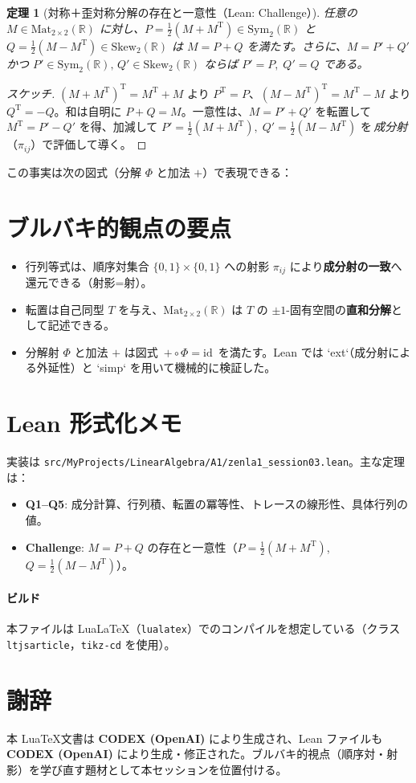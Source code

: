 \documentclass[luatexja,ja=standard,a4paper,12pt]{bxjsarticle}
\newcommand{\R}{\mathbb{R}}
\newcommand{\Mat}{\mathrm{Mat}}
\newcommand{\MatTwo}{\Mat_{2\times 2}(\R)}
\newcommand{\Sym}{\mathrm{Sym}_2(\R)}
\newcommand{\Skew}{\mathrm{Skew}_2(\R)}
\newcommand{\TT}{\mathrm{T}}
\theoremstyle{definition}
\theoremstyle{plain}
\newtheorem{theorem}{定理}
\theoremstyle{remark}
\begin{document}
\begin{theorem}[対称＋歪対称分解の存在と一意性（Lean: Challenge）]\label{thm:decomp}
任意の $M\in\MatTwo$ に対し、$P=\frac12(M+M^{\TT})\in\Sym$ と $Q=\frac12(M-M^{\TT})\in\Skew$ は $M=P+Q$ を満たす。さらに、$M=P'+Q'$ かつ $P'\in\Sym,\,Q'\in\Skew$ ならば $P'=P,\;Q'=Q$ である。
\end{theorem}

\begin{proof}[スケッチ]
$(M+M^{\TT})^{\TT}=M^{\TT}+M$ より $P^{\TT}=P$、$(M-M^{\TT})^{\TT}=M^{\TT}-M$ より $Q^{\TT}=-Q$。和は自明に $P+Q=M$。一意性は、$M=P'+Q'$ を転置して $M^{\TT}=P'-Q'$ を得、加減して $P'=\tfrac12(M+M^{\TT}),\;Q'=\tfrac12(M-M^{\TT})$ を\,\emph{成分射}\,（$\pi_{ij}$）で評価して導く。
\end{proof}

この事実は次の図式（分解 $\Phi$ と加法 $+$）で表現できる：
\begin{center}
\end{center}

\section{ブルバキ的観点の要点}
\begin{itemize}
  \item 行列等式は、順序対集合 $\{0,1\}\times\{0,1\}$ への射影 $\pi_{ij}$ により\textbf{成分射の一致}へ還元できる（射影=射）。
  \item 転置は自己同型 $T$ を与え、$\MatTwo$ は $T$ の $\pm 1$-固有空間の\textbf{直和分解}として記述できる。
  \item 分解射 $\Phi$ と加法 $+$ は図式 \,$+\circ\Phi=\mathrm{id}$\, を満たす。Lean では `ext`（成分射による外延性）と `simp` を用いて機械的に検証した。
\end{itemize}

\section{Lean 形式化メモ}
実装は \texttt{src/MyProjects/LinearAlgebra/A1/zenla1\_session03.lean}。主な定理は：
\begin{itemize}
  \item \textbf{Q1--Q5}: 成分計算、行列積、転置の冪等性、トレースの線形性、具体行列の値。
  \item \textbf{Challenge}: $M=P+Q$ の存在と一意性（$P=\frac12(M+M^{\TT})$, $Q=\frac12(M-M^{\TT})$）。
\end{itemize}

\paragraph{ビルド} 本ファイルは Lua\LaTeX（\texttt{lualatex}）でのコンパイルを想定している（クラス \texttt{ltjsarticle}，\texttt{tikz-cd} を使用）。

\section*{謝辞}
本 Lua\TeX 文書は \textbf{CODEX (OpenAI)} により生成され、Lean ファイルも \textbf{CODEX (OpenAI)} により生成・修正された。ブルバキ的視点（順序対・射影）を学び直す題材として本セッションを位置付ける。
\end{document}
